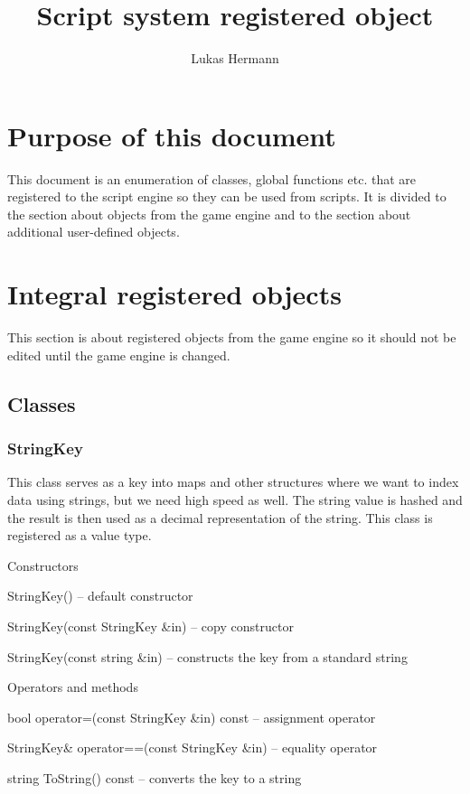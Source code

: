 \documentclass[12pt, a4paper]{article}
\newenvironment{titled-itemize}[1]
{
\vspace{5mm}
\noindent\textbf{#1}
\begin{itemize}
}
{
\end{itemize}
}
\begin{document}
\title{Script system registered object}
\author{Lukas Hermann}
\maketitle

\tableofcontents

\newpage

\section{Purpose of this document}

This document is an enumeration of classes, global functions etc. that are registered to the script engine so they can be used from scripts. It is divided to the section about objects from the game engine and to the section about additional user-defined objects.

\section{Integral registered objects}

This section is about registered objects from the game engine so it should not be edited until the game engine is changed.

\subsection{Classes}

\subsubsection{StringKey}

This class serves as a key into maps and other structures where we want to index data using strings, but we need high speed as well. The string value is hashed and the result is then used as a decimal representation of the string. This class is registered as a value type.

\begin{titled-itemize}{Constructors}
	\item StringKey() -- default constructor
	\item StringKey(const StringKey \&in) -- copy constructor
	\item StringKey(const string \&in) -- constructs the key from a standard string
\end{titled-itemize}

\begin{titled-itemize}{Operators and methods}
  \item bool operator=(const StringKey \&in) const -- assignment operator
  \item StringKey\& operator==(const StringKey \&in) -- equality operator
  \item string ToString() const -- converts the key to a string
\end{titled-itemize}
\end{document}
